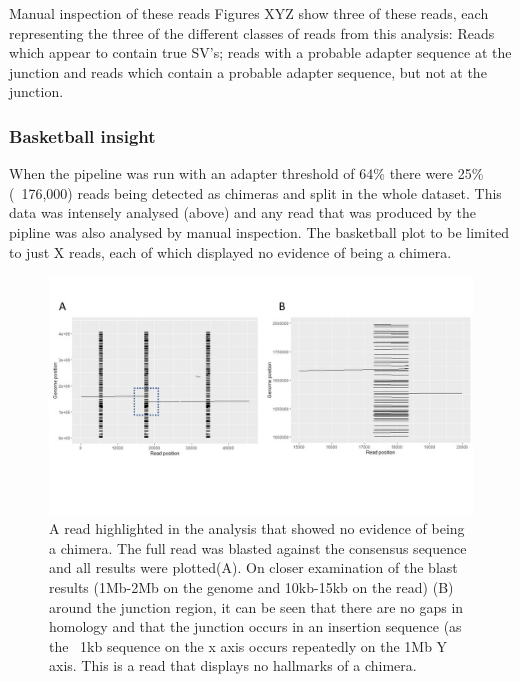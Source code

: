  Manual inspection of these reads
 Figures XYZ show three of these reads, each representing the three of the different classes of reads from this analysis: Reads which appear to contain true SV's; reads with a probable adapter sequence at the junction and reads which contain a probable adapter sequence, but not at the junction.

\subsubsection{Basketball insight}
When the pipeline was run with an adapter threshold of 64\% there were 25\% (~176,000) reads being detected as chimeras and split in the whole dataset. This data was intensely analysed (above) and any read that was produced by the pipline was also analysed by manual inspection.  The basketball plot to be limited to just X reads, each of which displayed no evidence of being a chimera.

\begin{figure}[h!]
\centering
\includegraphics[width=\textwidth{}]{Chapter_2/Read 9(2).jpg}
\caption{ A read highlighted in the analysis that showed no evidence of being a chimera. The full read was blasted against the consensus sequence and all results were plotted(A). On closer examination of the blast results (1Mb-2Mb on the genome and 10kb-15kb on the read) (B) around the junction region, it can be seen that there are no gaps in homology and that the junction occurs in an insertion sequence (as the ~1kb sequence on the x axis occurs repeatedly on the 1Mb Y axis. This is a read that displays no hallmarks of a chimera.}
\label{fig:Heatmap}
\end{figure}





